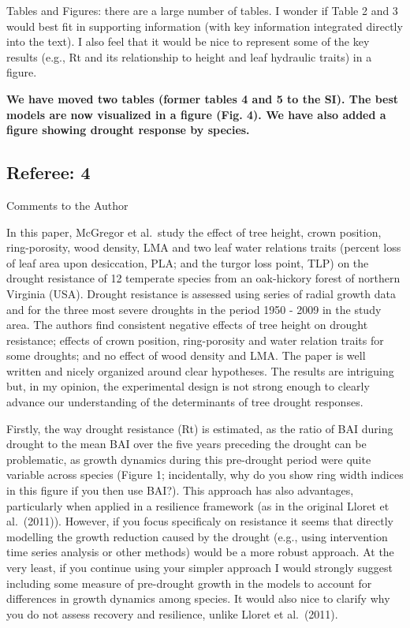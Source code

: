 \documentclass[
]{article}
\begin{document}
Tables and Figures: there are a large number of tables. I wonder if
Table 2 and 3 would best fit in supporting information (with key
information integrated directly into the text). I also feel that it
would be nice to represent some of the key results (e.g., Rt and its
relationship to height and leaf hydraulic traits) in a figure.

\textbf{We have moved two tables (former tables 4 and 5 to the SI). The
best models are now visualized in a figure (Fig. 4). We have also added
a figure showing drought response by species.}

\hypertarget{referee-4}{%
\subsection{Referee: 4}\label{referee-4}}

Comments to the Author

In this paper, McGregor et al.~study the effect of tree height, crown
position, ring-porosity, wood density, LMA and two leaf water relations
traits (percent loss of leaf area upon desiccation, PLA; and the turgor
loss point, TLP) on the drought resistance of 12 temperate species from
an oak-hickory forest of northern Virginia (USA). Drought resistance is
assessed using series of radial growth data and for the three most
severe droughts in the period 1950 - 2009 in the study area. The authors
find consistent negative effects of tree height on drought resistance;
effects of crown position, ring-porosity and water relation traits for
some droughts; and no effect of wood density and LMA. The paper is well
written and nicely organized around clear hypotheses. The results are
intriguing but, in my opinion, the experimental design is not strong
enough to clearly advance our understanding of the determinants of tree
drought responses.

Firstly, the way drought resistance (Rt) is estimated, as the ratio of
BAI during drought to the mean BAI over the five years preceding the
drought can be problematic, as growth dynamics during this pre-drought
period were quite variable across species (Figure 1; incidentally, why
do you show ring width indices in this figure if you then use BAI?).
This approach has also advantages, particularly when applied in a
resilience framework (as in the original Lloret et al.~(2011)). However,
if you focus specificaly on resistance it seems that directly modelling
the growth reduction caused by the drought (e.g., using intervention
time series analysis or other methods) would be a more robust approach.
At the very least, if you continue using your simpler approach I would
strongly suggest including some measure of pre-drought growth in the
models to account for differences in growth dynamics among species. It
would also nice to clarify why you do not assess recovery and
resilience, unlike Lloret et al.~(2011).
\end{document}
